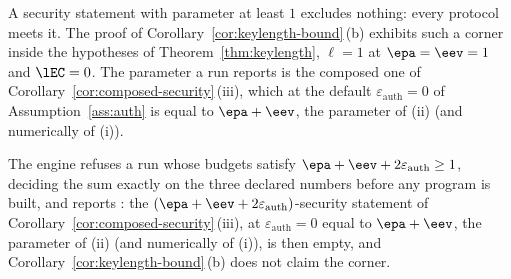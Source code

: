 
A security statement with parameter at least $1$ excludes nothing: every
protocol meets it. The proof of Corollary~\ref{cor:keylength-bound}\,(b)
exhibits such a corner inside the hypotheses of
Theorem~\ref{thm:keylength}, $\ell=1$ at $\epa=\eev=1$ and $\lEC=0$. The
parameter a run reports is the composed one of
Corollary~\ref{cor:composed-security}\,(iii), which at the default
$\varepsilon_{\mathrm{auth}}=0$ of Assumption~\ref{ass:auth} is equal to
$\epa+\eev$, the parameter of (ii) (and numerically of (i)).

\begin{requirement}\label{req:security-statement-not-vacuous}
The engine refuses a run whose budgets satisfy
$\epa+\eev+2\varepsilon_{\mathrm{auth}}\ge1$, deciding the sum exactly on the
three declared numbers before any program is built, and reports
: the
$(\epa+\eev+2\varepsilon_{\mathrm{auth}})$-security statement of
Corollary~\ref{cor:composed-security}\,(iii), at
$\varepsilon_{\mathrm{auth}}=0$ equal to $\epa+\eev$, the parameter of (ii)
(and numerically of (i)), is then empty, and Corollary~\ref{cor:keylength-bound}\,(b) does
not claim the corner.
\end{requirement}

